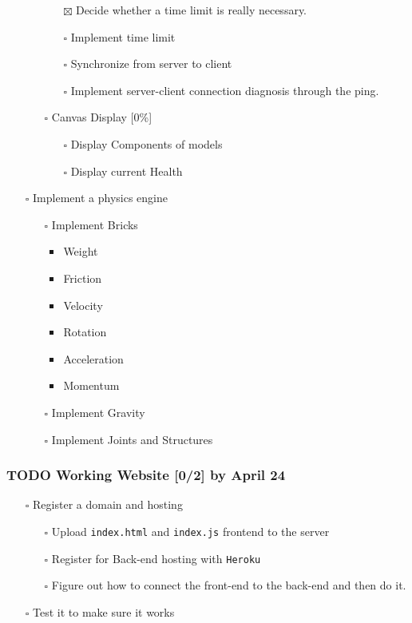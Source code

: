\documentclass[11pt]{article}
\begin{document}
\begin{itemize}
\begin{itemize}
\begin{itemize}
\item[{$\boxtimes$}] Decide whether a time limit is really necessary.
\item[{$\square$}] Implement time limit
\item[{$\square$}] Synchronize from server to client
\item[{$\square$}] Implement server-client connection diagnosis through the ping.
\end{itemize}
\item[{$\square$}] Canvas Display [0\%]
\begin{itemize}
\item[{$\square$}] Display Components of models
\item[{$\square$}] Display current Health
\end{itemize}
\end{itemize}
\item[{$\square$}] Implement a physics engine
\begin{itemize}
\item[{$\square$}] Implement Bricks
\begin{itemize}
\item Weight
\item Friction
\item Velocity
\item Rotation
\item Acceleration
\item Momentum
\end{itemize}
\item[{$\square$}] Implement Gravity
\item[{$\square$}] Implement Joints and Structures
\end{itemize}
\end{itemize}
\subsubsection{{\bfseries\sffamily TODO} Working Website [0/2] by April 24}
\label{sec:org3c7324d}
\begin{itemize}
\item[{$\square$}] Register a domain and hosting
\begin{itemize}
\item[{$\square$}] Upload \texttt{index.html} and \texttt{index.js} frontend to the server
\item[{$\square$}] Register for Back-end hosting with \texttt{Heroku}
\item[{$\square$}] Figure out how to connect the front-end to the back-end and then do it.
\end{itemize}
\item[{$\square$}] Test it to make sure it works
\end{itemize}
\end{document}
